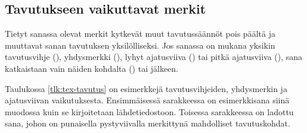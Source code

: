\begin{koodilohkosis}
\end{koodilohkosis}

\subsection{Tavutukseen vaikuttavat merkit}

Tietyt sanassa olevat merkit kytkevät muut tavutussäännöt pois päältä ja
muuttavat sanan tavutuksen yksilölliseksi. Jos sanassa on mukana yksikin
tavutusvihje (\koodi{\keno-}), yhdysmerkki (\koodi{-}), lyhyt
ajatusviiva (\koodi{--}) tai pitkä ajatusviiva (\koodi{---}), sana
katkaistaan vain näiden kohdalta (\koodi{\keno-}) tai jälkeen.


Taulukossa \ref{tlk:tex-tavutus} on esimerkkejä tavutusvihjeiden,
yhdysmerkin ja ajatusviivan vaikutuksesta. Ensimmäisessä sarakkeessa on
esimerkkisana siinä muodossa kuin se kirjoitetaan lähdetiedostoon.
Toisessa sarakkeessa on ladottu sana, johon on punaisella pystyviivalla
merkittynä mahdolliset tavutuskohdat.

